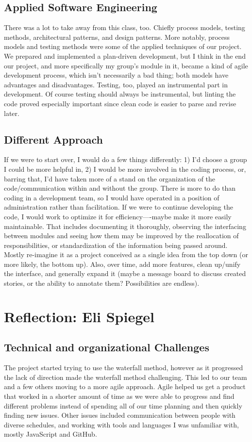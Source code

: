 \documentclass[a4paper]{article}
\begin{document}
\subsection{Applied Software Engineering}
There was a lot to take away from this class, too. Chiefly process models, testing methods, architectural patterns, and design patterns. More notably, process models and testing methods were some of the applied techniques of our project. We prepared and implemented a plan-driven development, but I think in the end our project, and more specifically my group's module in it, became a kind of agile development process, which isn't necessarily a bad thing; both models have advantages and disadvantages. Testing, too, played an instrumental part in development. Of course testing should always be instrumental, but linting the code proved especially important since clean code is easier to parse and revise later.
\subsection{Different Approach}
If we were to start over, I would do a few things differently: 1) I'd choose a group I could be more helpful in, 2) I would be more involved in the coding process, or, barring that, I'd have taken more of a stand on the organization of the code/communication within and without the group. There is more to do than coding in a development team, so I would have operated in a position of administration rather than facilitation. If we were to continue developing the code, I would work to optimize it for efficiency—-maybe make it more easily maintainable. That includes documenting it thoroughly, observing the interfacing between modules and seeing how them may be improved by the reallocation of responsibilities, or standardization of the information being passed around. Mostly re-imagine it as a project conceived as a single idea from the top down (or more likely, the bottom up). Also, over time, add more features, clean up/unify the interface, and generally expand it (maybe a message board to discuss created stories, or the ability to annotate them? Possibilities are endless).
\section{Reflection: Eli Spiegel}
\subsection{Technical and organizational Challenges}
The project started trying to use the waterfall method, however as it progressed the lack of direction made the waterfall method challenging. This led to our team and a few others moving to a more agile approach. Agile helped us get a product that worked in a shorter amount of time as we were able to progress and find different problems instead of spending all of our time planning and then quickly finding new issues. Other issues included communication between people with diverse schedules, and working with tools and languages I was unfamiliar with, mostly JavaScript and GitHub.
\end{document}

